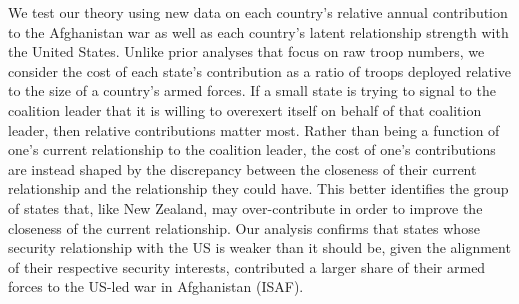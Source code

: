 \documentclass[12pt,letterpaper]{article}
\begin{document}
	We test our theory using new data on each country's relative annual contribution to the Afghanistan war as well as each country's latent relationship strength with the United States. Unlike prior analyses that focus on raw troop numbers, we consider the cost of each state's contribution as a ratio of troops deployed relative to the size of a country's armed forces. If a small state is trying to signal to the coalition leader that it is willing to overexert itself on behalf of that coalition leader, then relative contributions matter most. Rather than being a function of one's current relationship to the coalition leader, the cost of one's contributions are instead shaped by the discrepancy between the closeness of their current relationship and the relationship they could have. This better identifies the group of states that, like New Zealand, may over-contribute in order to improve the closeness of the current relationship. Our analysis confirms that states whose security relationship with the US is weaker than it should be, given the alignment of their respective security interests, contributed a larger share of their armed forces to the US-led war in Afghanistan (ISAF).
	
\end{document}
